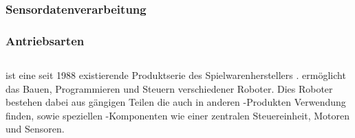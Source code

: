 \subsubsection{Sensordatenverarbeitung}
\subsubsection{Antriebsarten}
\subsection{\LM}
\color{finishing}
\LM{} ist eine seit 1988 existierende Produktserie des Spielwarenherstellers \LE{} \cite[vgl.][21]{Scholz.DasEV3}. 
\LM{} ermöglicht das Bauen, Programmieren und Steuern verschiedener \LE{} Roboter. Dies Roboter bestehen dabei aus
gängigen \LE{} Teilen die auch in anderen \LE{}-Produkten Verwendung finden, sowie speziellen \LE{}-Komponenten 
wie einer zentralen Steuereinheit, Motoren und Sensoren.
